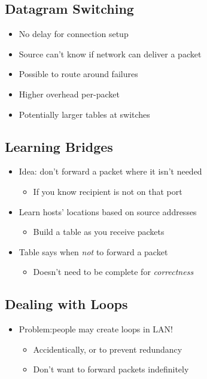 \subsection{Datagram Switching}
\begin{itemize}[nosep]
    \item No delay for connection setup
    \item Source can't know if network can deliver a packet
    \item Possible to route around failures
    \item Higher overhead per-packet
    \item Potentially larger tables at switches
\end{itemize}

\subsection{Learning Bridges}
\begin{itemize}[nosep]
    \item Idea: don't forward a packet where it isn't needed
          \begin{itemize}[nosep]
              \item If you know recipient is not on that port
          \end{itemize}
    \item Learn hosts' locations based on source addresses
          \begin{itemize}[nosep]
              \item Build a table as you receive packets
          \end{itemize}
    \item Table says when \emph{not} to forward a packet
          \begin{itemize}[nosep]
              \item Doesn't need to be complete for \emph{correctness}
          \end{itemize}
\end{itemize}

\subsection{Dealing with Loops}
\begin{itemize}[nosep]
    \item Problem:people may create loops in LAN!
          \begin{itemize}[nosep]
              \item Accidentically, or to prevent redundancy
              \item Don't want to forward packets indefinitely
          \end{itemize}
\end{itemize}

